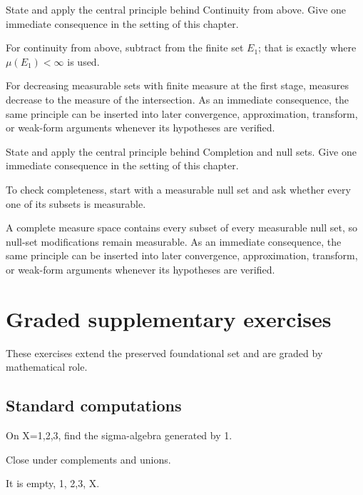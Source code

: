 \begin{exercise}\label{exr:iii01-07}
State and apply the central principle behind Continuity from above. Give one immediate consequence in the setting of this chapter.
\end{exercise}
\begin{hint}
For continuity from above, subtract from the finite set \(E_1\); that is exactly where \(\mu(E_1)<\infty\) is used.
\end{hint}
\begin{solution}
For decreasing measurable sets with finite measure at the first stage, measures decrease to the measure of the intersection. As an immediate consequence, the same principle can be inserted into later convergence, approximation, transform, or weak-form arguments whenever its hypotheses are verified.
\end{solution}

\begin{exercise}\label{exr:iii01-08}
State and apply the central principle behind Completion and null sets. Give one immediate consequence in the setting of this chapter.
\end{exercise}
\begin{hint}
To check completeness, start with a measurable null set and ask whether every one of its subsets is measurable.
\end{hint}
\begin{solution}
A complete measure space contains every subset of every measurable null set, so null-set modifications remain measurable. As an immediate consequence, the same principle can be inserted into later convergence, approximation, transform, or weak-form arguments whenever its hypotheses are verified.
\end{solution}


\section{Graded supplementary exercises}
These exercises extend the preserved foundational set and are graded by mathematical role.

\subsection*{Standard computations}

\begin{exercise}\label{exr:iii01-expand-01}
On X={1,2,3}, find the sigma-algebra generated by {1}.
\end{exercise}
\begin{hint}
Close under complements and unions.
\end{hint}
\begin{solution}
It is {empty, {1}, {2,3}, X}.
\end{solution}


